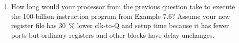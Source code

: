 \documentclass{e85}
\begin{document}
\begin{enumerate}

\item How long would your processor from the previous question take to
  execute the 100-billion instruction program from Example 7.6?
  Assume your new register file has \SI{30}{\percent} lower clk-to-Q
  and setup time because it has fewer ports but ordinary registers and
  other blocks have delay unchanges.


\end{enumerate}
\end{document}
